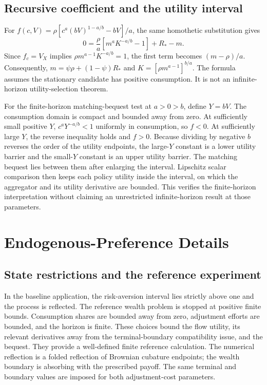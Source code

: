 \documentclass[ecta,draft]{econsocart}
\theoremstyle{definition}
\theoremstyle{remark}
\begin{document}
\subsection{Recursive coefficient and the utility interval}
For $f(c,V)=\rho[c^a(bV)^{1-a/b}-bV]/a$, the same homothetic substitution gives
\[
 0=\frac\rho a[m^aK^{-a/b}-1]+R_*-m.
\]
Since $f_c=V_X$ implies $\rho m^{a-1}K^{-a/b}=1$, the first term becomes $(m-\rho)/a$. Consequently, $m=\psi\rho+(1-\psi)R_*$ and $K=[\rho m^{a-1}]^{b/a}$. The formula assumes the stationary candidate has positive consumption. It is not an infinite-horizon utility-selection theorem.

For the finite-horizon matching-bequest test at $a>0>b$, define $Y=bV$. The consumption domain is compact and bounded away from zero. At sufficiently small positive $Y$, $c^aY^{-a/b}<1$ uniformly in consumption, so $f<0$. At sufficiently large $Y$, the reverse inequality holds and $f>0$. Because dividing by negative $b$ reverses the order of the utility endpoints, the large-$Y$ constant is a lower utility barrier and the small-$Y$ constant is an upper utility barrier. The matching bequest lies between them after enlarging the interval. Lipschitz scalar comparison then keeps each policy utility inside the interval, on which the aggregator and its utility derivative are bounded. This verifies the finite-horizon interpretation without claiming an unrestricted infinite-horizon result at those parameters.

\section{Endogenous-Preference Details}
\subsection{State restrictions and the reference experiment}
In the baseline application, the risk-aversion interval lies strictly above one and the process is reflected. The reference wealth problem is stopped at positive finite bounds. Consumption shares are bounded away from zero, adjustment efforts are bounded, and the horizon is finite. These choices bound the flow utility, its relevant derivatives away from the terminal-boundary compatibility issue, and the bequest. They provide a well-defined finite reference calculation. The numerical reflection is a folded reflection of Brownian cubature endpoints; the wealth boundary is absorbing with the prescribed payoff. The same terminal and boundary values are imposed for both adjustment-cost parameters.
\end{document}
